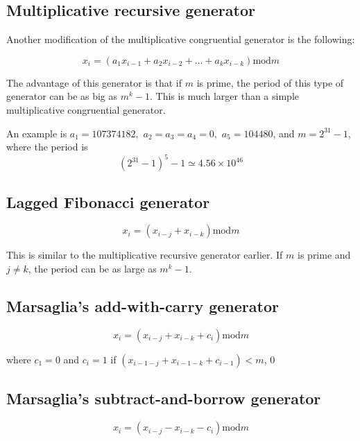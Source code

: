 \documentclass[justified,sixbynine]{tufte-book}
\theoremstyle{plain}%
\theoremstyle{definition}
\theoremstyle{remark}
\begin{document}
\begin{fullwidth}
\goodbreak\subsection{Multiplicative recursive generator}

Another modification of the multiplicative congruential generator is the following:

\begin{equation}
x_i=(a_1x_{i-1}+a_2x_{i-2}+\dots+a_kx_{i-k})\textrm{mod}m
\end{equation}

The advantage of this generator is that if $m$ is prime, the period of this
type of generator can be as big as $m^k-1$. This is much larger than a
simple multiplicative congruential generator.

An example is $a_1=107374182,$ $a_2=a_3=a_4=0,$ $a_5=104480$, and $m=2^{31}-1$,
where the period is
\begin{equation}
(2^{31}-1)^5-1\simeq 4.56\times 10^{46}
\end{equation}

\goodbreak\subsection{Lagged Fibonacci generator}

\begin{equation}
x_i=(x_{i-j}+x_{i-k})\textrm{mod}m
\end{equation}

This is similar to the multiplicative recursive generator earlier. If $m$ is
prime and $j\neq k$, the period can be as large as $m^k-1$.

\goodbreak\subsection{Marsaglia's add-with-carry generator}

\begin{equation}
x_i=(x_{i-j}+x_{i-k}+c_i)\textrm{mod}m
\end{equation}

where $c_1=0$ and $c_i=1$ if $(x_{i-1-j}+x_{i-1-k}+c_{i-1})<m$, $0$

\goodbreak\subsection{Marsaglia's subtract-and-borrow generator}

\begin{equation}
x_i=(x_{i-j}-x_{i-k}-c_i)\textrm{mod}m
\end{equation}


\end{fullwidth}
\end{document}
